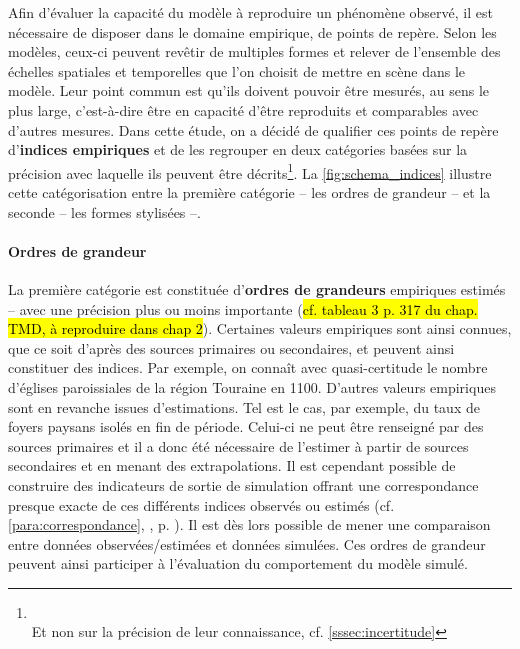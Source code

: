 Afin d’évaluer la capacité du modèle à reproduire un phénomène observé, il est nécessaire de disposer dans le domaine empirique, de \og points de repère\fg{}.
Selon les modèles, ceux-ci peuvent revêtir de multiples formes et relever de l'ensemble des échelles spatiales et temporelles que l'on choisit de mettre en scène dans le modèle.
Leur point commun est qu'ils doivent pouvoir être mesurés, au sens le plus large, c'est-à-dire être en capacité d'être reproduits et comparables avec d'autres mesures.
Dans cette étude, on a décidé de qualifier ces points de repère d'\og\textbf{indices empiriques}\fg{} et de les regrouper en deux catégories basées sur la précision avec laquelle ils peuvent être décrits\footnote{\\Et non sur la précision de leur connaissance, cf. \cref{sssec:incertitude}}.
La \cref{fig:schema_indices} illustre cette catégorisation entre la première catégorie -- les ordres de grandeur -- et la seconde -- les formes stylisées --.

\paragraph{Ordres de grandeur}
La première catégorie est constituée d'\textbf{ordres de grandeurs} empiriques estimés -- avec une précision plus ou moins importante (\hl{cf. tableau 3 p. 317 du chap. TMD, à reproduire dans chap 2}).
Certaines valeurs empiriques sont ainsi connues, que ce soit d'après des sources primaires ou secondaires, et peuvent ainsi constituer des indices.
Par exemple, on connaît avec quasi-certitude le nombre d'églises paroissiales de la région Touraine en 1100.
D'autres valeurs empiriques sont en revanche issues d'estimations.
Tel est le cas, par exemple, du taux de foyers paysans isolés en fin de période.
Celui-ci ne peut être renseigné par des sources primaires et il a donc été nécessaire de l'estimer à partir de sources secondaires et en menant des extrapolations.
Il est cependant possible de construire des indicateurs de sortie de simulation offrant une correspondance presque exacte de ces différents indices observés ou estimés (cf. \ref{para:correspondance}, , p. \pageref{para:correspondance}).
Il est dès lors possible de mener une comparaison entre données observées/estimées et données simulées.
Ces ordres de grandeur peuvent ainsi participer à l'évaluation du comportement du modèle simulé.

